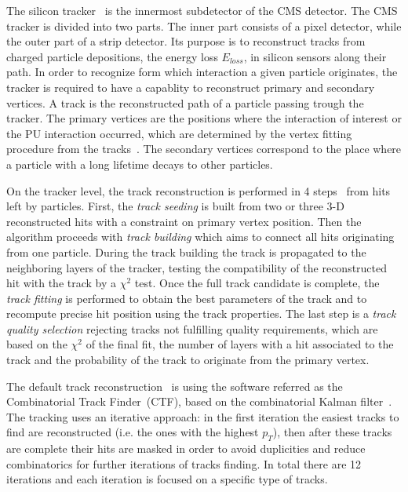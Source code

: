 The silicon tracker~\cite{CMS:1997tlf, CMS:2000eqx} is the innermost subdetector of the CMS detector. The CMS tracker is divided into two parts. The inner part consists of a pixel detector, while the outer part of a strip detector.  Its purpose is to reconstruct tracks from charged particle depositions, the energy loss $E_{loss}$, in silicon sensors along their path. In order to recognize form which interaction a given particle originates, the tracker is required to have a capablity to reconstruct primary and secondary vertices. A track is the reconstructed path of a particle passing trough the tracker. The primary vertices are the positions where the interaction of interest or the PU interaction occurred, which are determined by the vertex fitting procedure from the tracks~\cite{Ball:2007zza}. The secondary vertices correspond to the place where a particle with a long lifetime decays to other particles. 

On the tracker level, the track reconstruction is performed in 4 steps~\cite{website:slidesTracking, website:twikiTracking} from hits left by particles. First, the \textit{track seeding} is built from two or three 3-D reconstructed hits with a constraint on primary vertex position. Then the algorithm proceeds with \textit{track building} which aims to connect all hits originating from one particle. During the track building the track is propagated to the neighboring layers of the tracker, testing the compatibility of the reconstructed hit with the track by a $\chi^{2}$ test. Once the full track candidate is complete, the \textit{track fitting} is performed to obtain the best parameters of the track and to recompute precise hit position using the track properties. The last step is a \textit{track quality selection} rejecting tracks not fulfilling quality requirements, which are based on the $\chi^{2}$ of the final fit, the number of layers with a hit associated to the track and the probability of the track  to originate from the primary vertex.

The default track reconstruction~\cite{Chatrchyan:2014fea} is using the software referred as the Combinatorial Track Finder~(CTF), based on the combinatorial Kalman filter~\cite{Fruhwirth:1987fm}. The tracking uses an iterative approach: in the first iteration the easiest tracks to find are reconstructed (i.e. the ones with the highest $p_{T}$), then after these tracks are complete their hits are masked in order to avoid duplicities and reduce combinatorics for further iterations of tracks finding. In total there are 12 iterations and each iteration is focused on a specific type of tracks.



